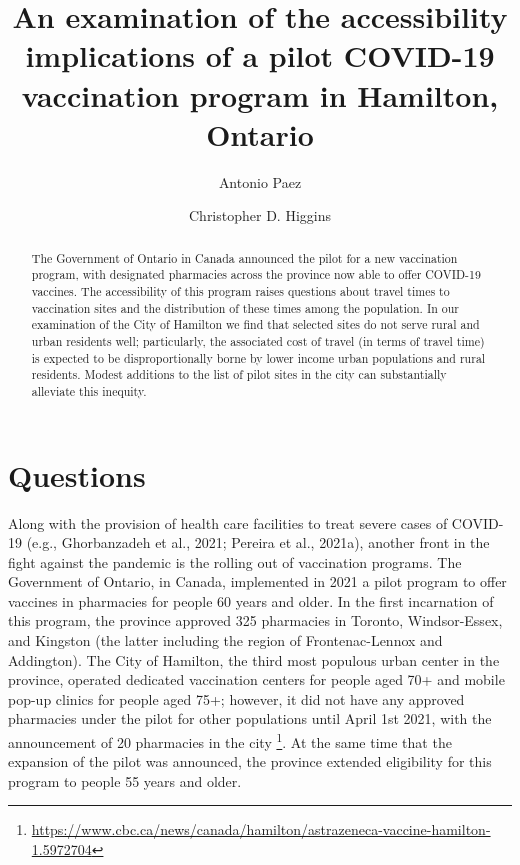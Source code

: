 \documentclass[]{elsarticle} %
\begin{document}
\begin{frontmatter}

  \title{An examination of the accessibility implications of a pilot
COVID-19 vaccination program in Hamilton, Ontario}
    \author[McMaster University]{Antonio Paez}
    \author[University of Toronto Scarborough]{Christopher D. Higgins}
      \address[McMaster University]{School of Earth, Environment and
Society, McMaster University, Hamilton, ON, L8S 4K1, Canada}
    \address[University of Toronto Scarborough]{Department of Geography
\& Planning, University of Toronto Scarborough, 1265 Military Trail,
Toronto, ON M1C1A4}
  
  \begin{abstract}
  The Government of Ontario in Canada announced the pilot for a new
  vaccination program, with designated pharmacies across the province
  now able to offer COVID-19 vaccines. The accessibility of this program
  raises questions about travel times to vaccination sites and the
  distribution of these times among the population. In our examination
  of the City of Hamilton we find that selected sites do not serve rural
  and urban residents well; particularly, the associated cost of travel
  (in terms of travel time) is expected to be disproportionally borne by
  lower income urban populations and rural residents. Modest additions
  to the list of pilot sites in the city can substantially alleviate
  this inequity.
  \end{abstract}
  
 \end{frontmatter}

\hypertarget{questions}{%
\section{Questions}\label{questions}}

Along with the provision of health care facilities to treat severe cases
of COVID-19 (e.g., Ghorbanzadeh et al., 2021; Pereira et al., 2021a),
another front in the fight against the pandemic is the rolling out of
vaccination programs. The Government of Ontario, in Canada, implemented
in 2021 a pilot program to offer vaccines in pharmacies for people 60
years and older. In the first incarnation of this program, the province
approved 325 pharmacies in Toronto, Windsor-Essex, and Kingston (the
latter including the region of Frontenac-Lennox and Addington). The City
of Hamilton, the third most populous urban center in the province,
operated dedicated vaccination centers for people aged 70+ and mobile
pop-up clinics for people aged 75+; however, it did not have any
approved pharmacies under the pilot for other populations until April
1st 2021, with the announcement of 20 pharmacies in the city
\footnote{\url{https://www.cbc.ca/news/canada/hamilton/astrazeneca-vaccine-hamilton-1.5972704}}.
At the same time that the expansion of the pilot was announced, the
province extended eligibility for this program to people 55 years and
older.
\end{document}
